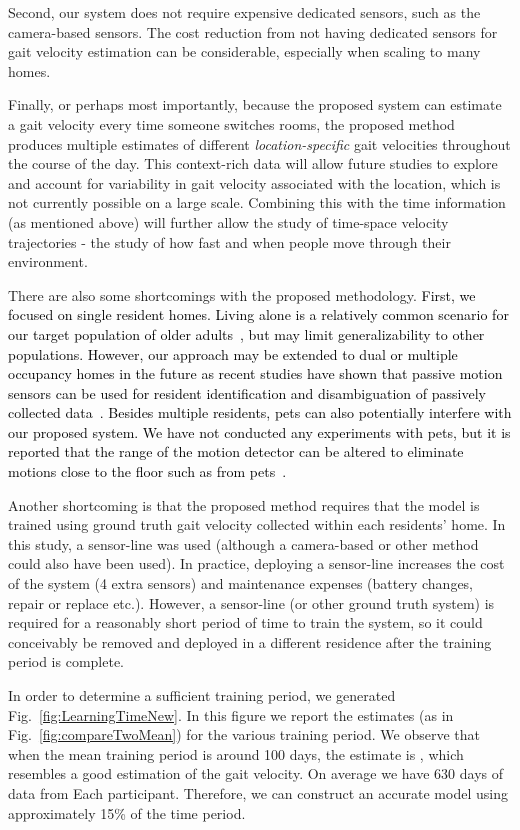 \documentclass[journal]{IEEEtran}
\newcommand{\ca}[1]{\textcolor{black}{#1}}
\begin{document}
Second, our system does not require expensive dedicated sensors, such as the camera-based sensors. The cost reduction from not having dedicated sensors for gait velocity estimation can be considerable, especially when scaling to many homes.  


Finally, or perhaps most importantly, because the proposed system can estimate a gait velocity every time someone switches rooms, the proposed method produces multiple estimates of different {\it location-specific} gait velocities throughout the course of the day.  This context-rich data will allow future studies to explore and account for variability in gait velocity associated with the location, which is not currently possible on a large scale.  Combining this with the time information (as mentioned above) will further allow the study of time-space velocity trajectories - the study of how fast and when people move through their environment.

There are also some shortcomings with the proposed methodology.  \ca{First, we focused on single resident homes.  Living alone is a relatively common scenario for our target population of older adults~\cite{greenberg2011profile}, but may limit generalizability to other populations.  However, our approach may be extended to dual or multiple occupancy homes in the future as recent studies have shown that passive motion sensors can be used for resident identification and disambiguation of passively collected data~\cite{Banerjee2012,Austin2011}. Besides multiple residents, pets can also potentially interfere with our proposed system. We have not conducted any experiments with pets, but it is reported that the range of the motion detector can be altered to eliminate motions close to the floor such as from pets~\cite{caudle2004illumination}.}

Another shortcoming is that the proposed method requires that the model is trained using ground truth gait velocity collected within each residents' home.  In this study, a sensor-line was used (although a camera-based or other method could also have been used). In practice, deploying a sensor-line increases the cost of the system (4 extra sensors) and maintenance expenses (battery changes, repair or replace etc.). However, a sensor-line (or other ground truth system) is required for a reasonably short period of time to train the system, so it could conceivably be removed and deployed in a different residence after the training period is complete.  

In order to determine a sufficient training period, we generated Fig.~\ref{fig:LearningTimeNew}. In this figure we report the  estimates (as in Fig.~\ref{fig:compareTwoMean}) for the various training period. We observe that when the mean training period is around 100 days, the  estimate is , which resembles a good estimation of the gait velocity. On average we have 630 days of data from Each participant. Therefore, we can construct an accurate model using approximately 15\% of the time period. 
\end{document}
